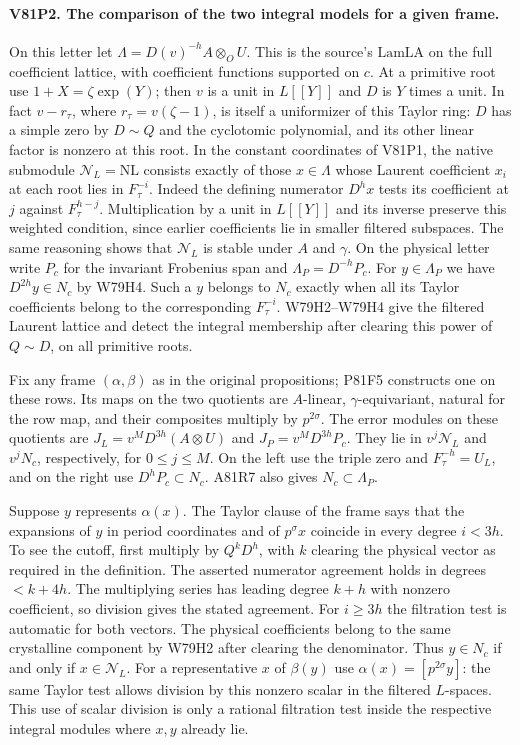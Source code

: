 \paragraph{V81P2. The comparison of the two integral models for a given frame.}
On this letter let $\Lambda= D(v)^{-h}A\otimes_O U$.
This is the source's $\mathrm{LamLA}$ on the full coefficient
lattice, with coefficient functions supported on $c$. At a
primitive root use $1+X=\zeta\exp(Y)$; then $v$ is a unit in
$L[[Y]]$ and $D$ is $Y$ times a unit. In fact $v-r_\tau$, where
$r_\tau=v(\zeta-1)$, is itself a uniformizer of this Taylor ring:
$D$ has a simple zero by $D\sim Q$ and the cyclotomic polynomial,
and its other linear factor is nonzero at this root.
In the constant coordinates of V81P1, the native submodule
$\mathcal N_L=\mathrm{NL}$ consists exactly of those $x\in\Lambda$
whose Laurent coefficient $x_i$ at each root lies in $F_\tau^{-i}$.
Indeed the defining numerator $D^hx$ tests its coefficient at $j$
against $F_\tau^{h-j}$. Multiplication by a unit in $L[[Y]]$ and
its inverse preserve this weighted condition, since earlier
coefficients lie in smaller filtered subspaces. The same reasoning
shows that $\mathcal N_L$ is stable under $A$ and $\gamma$.
On the physical letter write $P_c$ for the invariant Frobenius
span and $\Lambda_P=D^{-h}P_c$. For $y\in\Lambda_P$ we have
$D^{2h}y\in N_c$ by W79H4. Such a $y$ belongs to $N_c$ exactly
when all its Taylor coefficients belong to the corresponding
$F_\tau^{-i}$. W79H2--W79H4 give the filtered Laurent lattice
and detect the integral membership after clearing this power of
$Q\sim D$, on all primitive roots.

Fix any frame $(\alpha,\beta)$ as in the original propositions; P81F5 constructs one on these rows.
Its maps on the two quotients are $A$-linear, $\gamma$-equivariant,
natural for the row map, and their composites multiply by
$p^{2\sigma}$. The error modules on these quotients are
$J_L=v^M D^{3h}(A\otimes U)$ and $J_P=v^M D^{3h}P_c$.
They lie in $v^j\mathcal N_L$ and $v^jN_c$, respectively,
for $0\le j\le M$. On the left use the triple zero and
$F_\tau^{-h}=U_L$, and on the right use $D^hP_c\subset N_c$.
A81R7 also gives $N_c\subset\Lambda_P$.

Suppose $y$ represents $\alpha(x)$. The Taylor clause of the frame
says that the expansions of $y$ in period coordinates and of $p^\sigma x$
coincide in every degree $i<3h$. To see the cutoff, first multiply
by $Q^kD^h$, with $k$ clearing the physical vector as required
in the definition. The asserted numerator agreement holds in
degrees $<k+4h$. The multiplying series has leading degree $k+h$
with nonzero coefficient, so division gives the stated agreement.
For $i\ge3h$ the filtration test is automatic for both vectors.
The physical coefficients belong to the same crystalline component
by W79H2 after clearing the denominator. Thus $y\in N_c$ if and
only if $x\in\mathcal N_L$. For a representative $x$ of $\beta(y)$
use $\alpha(x)=[p^{2\sigma}y]$: the same Taylor test allows
division by this nonzero scalar in the filtered $L$-spaces.
This use of scalar division is only a rational filtration test
inside the respective integral modules where $x,y$ already lie.

